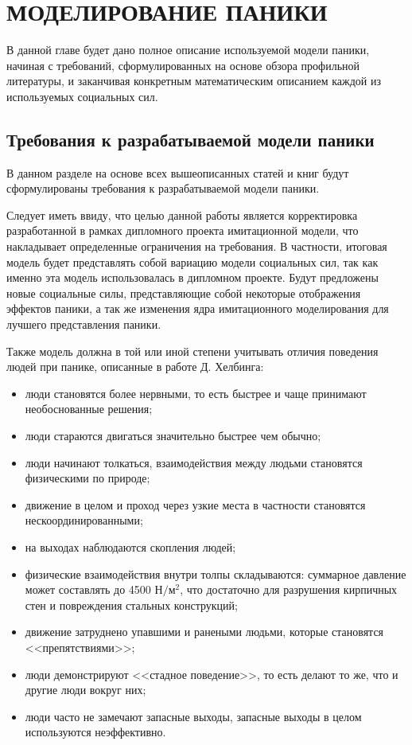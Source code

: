 \chapter{МОДЕЛИРОВАНИЕ ПАНИКИ}
\label{sec:model}

В данной главе будет дано полное описание используемой модели паники,
начиная с требований, сформулированных на основе обзора профильной литературы,
и заканчивая конкретным математическим описанием каждой из используемых социальных сил.

\section{Требования к разрабатываемой модели паники}
\label{sub:model:demands}

В данном разделе на основе всех вышеописанных статей и книг будут сформулированы требования к разрабатываемой модели паники.

Следует иметь ввиду, что целью данной работы является корректировка разработанной в рамках дипломного проекта имитационной модели, что накладывает определенные ограничения на требования.
В частности, итоговая модель будет представлять собой вариацию модели социальных сил, так как именно эта модель использовалась в дипломном проекте.
Будут предложены новые социальные силы, представляющие собой некоторые отображения эффектов паники, а так же изменения ядра имитационного моделирования для лучшего представления паники.

Также модель должна в той или иной степени учитывать отличия поведения людей при панике, описанные в работе Д. Хелбинга:

\begin{itemize}
  \item люди становятся более нервными, то есть быстрее и чаще принимают необоснованные решения;
  \item люди стараются двигаться значительно быстрее чем обычно;
  \item люди начинают толкаться, взаимодействия между людьми становятся физическими по природе;
  \item движение в целом и проход через узкие места в частности становятся нескоординированными;
  \item на выходах наблюдаются скопления людей;
  \item физические взаимодействия внутри толпы складываются: суммарное давление может составлять до 4500 $\text{Н} / \text{м}^2$,
        что достаточно для разрушения кирпичных стен и повреждения стальных конструкций;
  \item движение затруднено упавшими и ранеными людьми, которые становятся <<препятствиями>>;
  \item люди демонстрируют <<стадное поведение>>, то есть делают то же, что и другие люди вокруг них;
  \item люди часто не замечают запасные выходы, запасные выходы в целом используются неэффективно.
\end{itemize}

